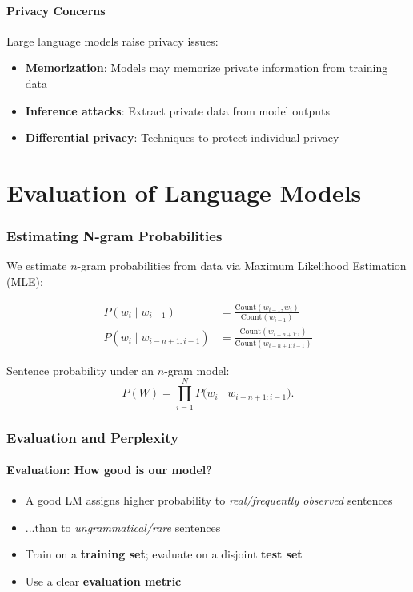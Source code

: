 \documentclass[11pt,a4paper]{article}
\theoremstyle{definition}
\theoremstyle{plain}
\theoremstyle{remark}
\begin{document}
  \subsection{Privacy Concerns}
  
  Large language models raise privacy issues:
  
  \begin{itemize}
      \item \textbf{Memorization}: Models may memorize private information from training data
      \item \textbf{Inference attacks}: Extract private data from model outputs
      \item \textbf{Differential privacy}: Techniques to protect individual privacy
  \end{itemize}

\newpage
\part{Evaluation of Language Models}

\section{Estimating N-gram Probabilities}

We estimate $n$-gram probabilities from data via Maximum Likelihood Estimation (MLE):

\begin{align*}
P(w_i \mid w_{i-1}) &= \frac{\text{Count}(w_{i-1}, w_i)}{\text{Count}(w_{i-1})} \\
P(w_i \mid w_{i-n+1:i-1}) &= \frac{\text{Count}(w_{i-n+1:i})}{\text{Count}(w_{i-n+1:i-1})}
\end{align*}

Sentence probability under an $n$-gram model:
\[
P(W) = \prod_{i=1}^{N} P\big(w_i \mid w_{i-n+1:i-1}\big).
\]

\section{Evaluation and Perplexity}

\subsection{Evaluation: How good is our model?}

\begin{itemize}
    \item A good LM assigns higher probability to \emph{real/frequently observed} sentences
    \item ...than to \emph{ungrammatical/rare} sentences
    \item Train on a \textbf{training set}; evaluate on a disjoint \textbf{test set}
    \item Use a clear \textbf{evaluation metric}
\end{itemize}
\end{document}
